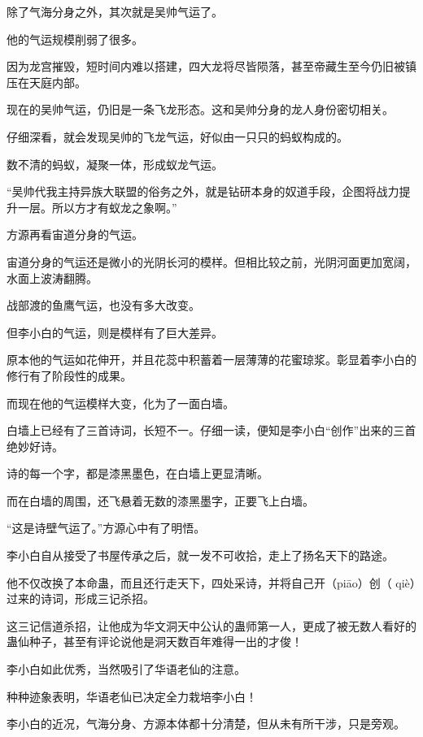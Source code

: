 
\begin{this_body}

除了气海分身之外，其次就是吴帅气运了。

他的气运规模削弱了很多。

因为龙宫摧毁，短时间内难以搭建，四大龙将尽皆陨落，甚至帝藏生至今仍旧被镇压在天庭内部。

现在的吴帅气运，仍旧是一条飞龙形态。这和吴帅分身的龙人身份密切相关。

仔细深看，就会发现吴帅的飞龙气运，好似由一只只的蚂蚁构成的。

数不清的蚂蚁，凝聚一体，形成蚁龙气运。

“吴帅代我主持异族大联盟的俗务之外，就是钻研本身的奴道手段，企图将战力提升一层。所以方才有蚁龙之象啊。”

方源再看宙道分身的气运。

宙道分身的气运还是微小的光阴长河的模样。但相比较之前，光阴河面更加宽阔，水面上波涛翻腾。

战部渡的鱼鹰气运，也没有多大改变。

但李小白的气运，则是模样有了巨大差异。

原本他的气运如花伸开，并且花蕊中积蓄着一层薄薄的花蜜琼浆。彰显着李小白的修行有了阶段性的成果。

而现在他的气运模样大变，化为了一面白墙。

白墙上已经有了三首诗词，长短不一。仔细一读，便知是李小白“创作”出来的三首绝妙好诗。

诗的每一个字，都是漆黑墨色，在白墙上更显清晰。

而在白墙的周围，还飞悬着无数的漆黑墨字，正要飞上白墙。

“这是诗壁气运了。”方源心中有了明悟。

李小白自从接受了书屋传承之后，就一发不可收拾，走上了扬名天下的路途。

他不仅改换了本命蛊，而且还行走天下，四处采诗，并将自己开（piāo）创（  qiè）过来的诗词，形成三记杀招。

这三记信道杀招，让他成为华文洞天中公认的蛊师第一人，更成了被无数人看好的蛊仙种子，甚至有评论说他是洞天数百年难得一出的才俊！

李小白如此优秀，当然吸引了华语老仙的注意。

种种迹象表明，华语老仙已决定全力栽培李小白！

李小白的近况，气海分身、方源本体都十分清楚，但从未有所干涉，只是旁观。


\end{this_body}
